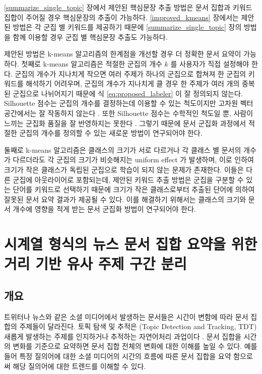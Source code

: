 \documentclass[oneside, ko,phd]{snuthesis_utf8_kor}
\begin{document}
\ref{summarize_single_topic} 장에서 제안된 핵심문장 추출 방법은 문서 집합과 키워드 집합이 주어질 경우 핵심문장의 추출이 가능하다.
\ref{improved_kmeans} 장에서는 제안된 방법은 각 군집 별 키워드를 제공하기 때문에 \ref{summarize_single_topic} 장의 방법을 함께 이용할 경우 군집 별 핵심문장 추출도 가능하다.

제안된 방법은 k-means 알고리즘의 한계점을 개선할 경우 더 정확한 문서 요약이 가능하다.
첫째로 k-means 알고리즘은 적절한 군집의 개수 $k$ 를 사용자가 직접 설정해야 한다.
군집의 개수가 지나치게 작으면 여러 주제가 하나의 군집으로 합쳐져 한 군집의 키워드를 해석하기 어려우며, 군집의 개수가 지나치게 클 경우 한 주제가 여러 개의 중복된 군집으로 나뉘어지기 때문에 식 \ref{eq:proposed_labeler} 이 잘 정의되지 않는다.
Silhouette 점수는 군집의 개수를 결정하는데 이용할 수 있는 척도이지만 고차원 벡터 공간에서는 잘 작동하지 않는다 \cite{almeida2011there}.
또한 Silhouette 점수는 수학적인 척도일 뿐, 사람이 느끼는 군집화 품질을 잘 반영하지는 못한다 \cite{newman2010evaluating}.
그렇기 때문에 문서 군집화 과정에서 적절한 군집의 개수를 정의할 수 있는 새로운 방법이 연구되어야 한다.

둘째로 k-means 알고리즘은 클래스의 크기가 서로 다르거나 각 클래스 별 문서의 개수가 다르더라도 각 군집의 크기가 비슷해지는 uniform effect \cite{xiong2008k} 가 발생하며, 이로 인하여 크기가 작은 클래스가 독립된 군집으로 학습이 되지 않는 문제가 존재한다.
이들은 다른 군집에 아웃라이어로 포함되는데, 제안된 키워드 추출 방법은 군집을 구분할 수 있는 단어를 키워드로 선택하기 때문에 크기가 작은 클래스로부터 추출된 단어에 의하여 잘못된 문서 요약 결과가 제공될 수 있다.
이를 해결하기 위해서는 클래스의 크기와 문서 개수에 영향을 적게 받는 문서 군집화 방법이 연구되어야 한다.

\newpage
\chapter{시계열 형식의 뉴스 문서 집합 요약을 위한 거리 기반 유사 주제 구간 분리} \label{timeseries_summarization}

\section{개요}

트위터나 뉴스와 같은 소셜 미디어에서 발생하는 문서들은 시간이 변함에 따라 문서 집합의 주제들이 달라진다.
토픽 탐색 및 추적은 (Topic Detection and Tracking, TDT) 새롭게 발생하는 주제를 인지하거나 추적하는 자연어처리 과업이다 \cite{fiscus2002topic}.
문서 집합을 시간의 변화를 기준으로 요약하면 문서 집합 전체의 변화에 대한 이해를 높일 수 있다.
예를 들어 특정 질의어에 대한 소셜 미디어의 시간의 흐름에 따른 문서 집합을 요약 함으로써 해당 질의어에 대한 트렌드를 이해할 수 있다.
\end{document}

